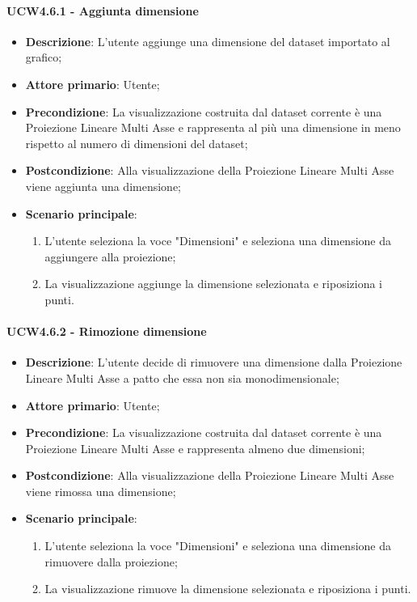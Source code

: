 \paragraph{UCW4.6.1 - Aggiunta dimensione}
\label{par:ucw4.6.1}
\begin{itemize}
    \item \textbf{Descrizione}: L’utente aggiunge una dimensione del dataset importato al grafico;

    \item \textbf{Attore primario}: Utente;

    \item \textbf{Precondizione}:   La visualizzazione costruita dal dataset corrente è una Proiezione Lineare Multi Asse
                                    e rappresenta al più una dimensione in meno rispetto al numero di dimensioni del dataset;
    \item \textbf{Postcondizione}:  Alla visualizzazione della Proiezione Lineare Multi Asse viene aggiunta una dimensione;

	\item \textbf{Scenario principale}:
        \begin{enumerate}
            \item L'utente seleziona la voce "Dimensioni" e seleziona una dimensione da aggiungere alla proiezione;
            \item La visualizzazione aggiunge la dimensione selezionata e riposiziona i punti.
        \end{enumerate}
\end{itemize}

\paragraph{UCW4.6.2 - Rimozione dimensione}
\label{par:ucw4.6.2}
\begin{itemize}
    \item \textbf{Descrizione}: L’utente decide di rimuovere una dimensione dalla Proiezione Lineare Multi Asse
                                a patto che essa non sia monodimensionale;

    \item \textbf{Attore primario}: Utente;

    \item \textbf{Precondizione}:   La visualizzazione costruita dal dataset corrente è una Proiezione Lineare Multi Asse
                                    e rappresenta almeno due dimensioni;
    \item \textbf{Postcondizione}:  Alla visualizzazione della Proiezione Lineare Multi Asse viene rimossa una dimensione;

	\item \textbf{Scenario principale}:
        \begin{enumerate}
            \item L'utente seleziona la voce "Dimensioni" e seleziona una dimensione da rimuovere dalla proiezione;
            \item La visualizzazione rimuove la dimensione selezionata e riposiziona i punti.
        \end{enumerate}
\end{itemize}

